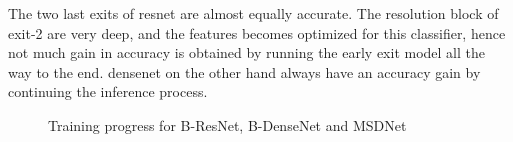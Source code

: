 The two last exits of \gls{resnet} are almost equally accurate. The resolution block of exit-2 are very deep, and the features becomes optimized for this classifier, hence not much gain in accuracy is obtained by running the early exit model all the way to the end. \gls{densenet} on the other hand always have an accuracy gain by continuing the inference process.    

\begin{figure}
	\captionsetup[subfigure]{justification=centering}
\end{figure}

\begin{figure}
	\captionsetup[subfigure]{justification=centering}
	\caption[Training progress of BrancyNets]{Training progress for \protect{} B-ResNet, \protect{} B-DenseNet and \protect{} MSDNet} 
	\label{fig:b-net-miniimagenet-100}
\end{figure}


